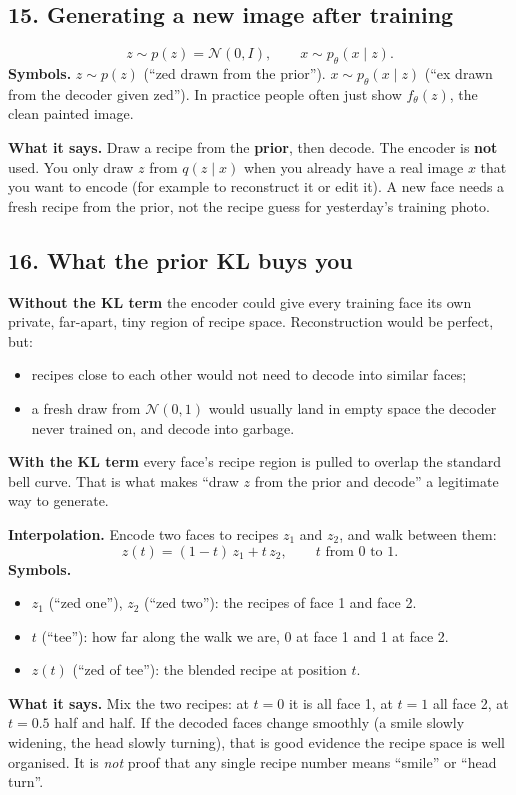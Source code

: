 \subsection*{15. Generating a new image after training}

\[
z \sim p(z) = \mathcal{N}(0, I), \qquad x \sim p_\theta(x \mid z).
\]
\textbf{Symbols.} $z \sim p(z)$ (``zed drawn from the prior''). $x \sim p_\theta(x \mid z)$ (``ex drawn from the decoder given zed''). In practice people often just show $f_\theta(z)$, the clean painted image.

\textbf{What it says.} Draw a recipe from the \textbf{prior}, then decode. The encoder is \textbf{not} used. You only draw $z$ from $q(z \mid x)$ when you already have a real image $x$ that you want to encode (for example to reconstruct it or edit it). A new face needs a fresh recipe from the prior, not the recipe guess for yesterday's training photo.

\subsection*{16. What the prior KL buys you}

\textbf{Without the KL term} the encoder could give every training face its own private, far-apart, tiny region of recipe space. Reconstruction would be perfect, but:
\begin{itemize}[leftmargin=1.5em]
\item recipes close to each other would not need to decode into similar faces;
\item a fresh draw from $\mathcal{N}(0,1)$ would usually land in empty space the decoder never trained on, and decode into garbage.
\end{itemize}
\textbf{With the KL term} every face's recipe region is pulled to overlap the standard bell curve. That is what makes ``draw $z$ from the prior and decode'' a legitimate way to generate.

\textbf{Interpolation.} Encode two faces to recipes $z_1$ and $z_2$, and walk between them:
\[
z(t) = (1 - t)\,z_1 + t\,z_2, \qquad t \text{ from } 0 \text{ to } 1.
\]
\textbf{Symbols.}
\begin{itemize}[leftmargin=1.5em, itemsep=0pt]
\item $z_1$ (``zed one''), $z_2$ (``zed two''): the recipes of face 1 and face 2.
\item $t$ (``tee''): how far along the walk we are, 0 at face 1 and 1 at face 2.
\item $z(t)$ (``zed of tee''): the blended recipe at position $t$.
\end{itemize}
\textbf{What it says.} Mix the two recipes: at $t = 0$ it is all face 1, at $t = 1$ all face 2, at $t = 0.5$ half and half. If the decoded faces change smoothly (a smile slowly widening, the head slowly turning), that is good evidence the recipe space is well organised. It is \emph{not} proof that any single recipe number means ``smile'' or ``head turn''.

